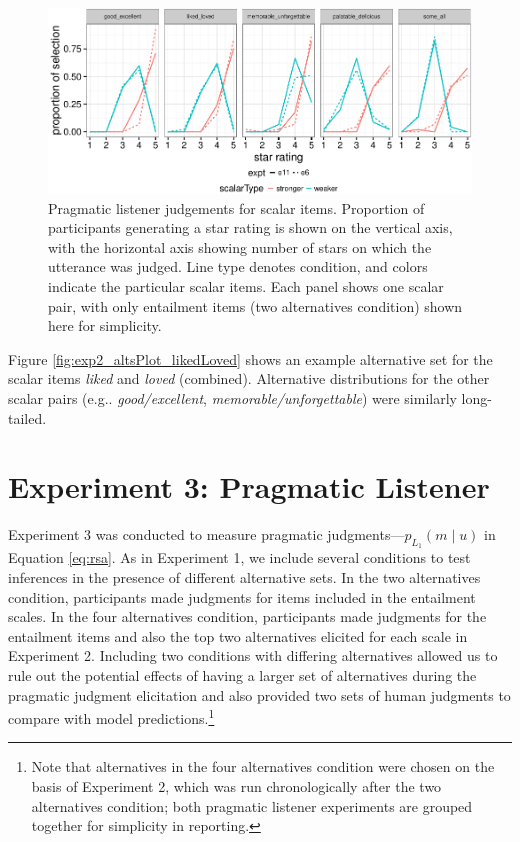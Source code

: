 \documentclass[10pt, letterpaper]{article}
\newenvironment{CodeChunk}{}{}
\begin{document}
\begin{CodeChunk}
\begin{figure}[t]

{\centering \includegraphics{figs/exp2Plots-1} 

}

\caption[Pragmatic listener judgements for scalar items]{Pragmatic listener judgements for scalar items. Proportion of participants generating a star rating is shown on the vertical axis, with the horizontal axis showing number of stars on which the utterance was judged. Line type denotes condition, and colors indicate the particular scalar items. Each panel shows one scalar pair, with only entailment items (two alternatives condition) shown here for simplicity.}\label{fig:exp2Plots}
\end{figure}
\end{CodeChunk}

Figure \ref{fig:exp2_altsPlot_likedLoved} shows an example alternative
set for the scalar items \emph{liked} and \emph{loved} (combined).
Alternative distributions for the other scalar pairs (e.g..
\emph{good/excellent}, \emph{memorable/unforgettable}) were similarly
long-tailed.

\section{Experiment 3: Pragmatic
Listener}\label{experiment-3-pragmatic-listener}

Experiment 3 was conducted to measure pragmatic
judgments---\(p_{L_1}(m \mid u)\) in Equation \ref{eq:rsa}. As in
Experiment 1, we include several conditions to test inferences in the
presence of different alternative sets. In the two alternatives
condition, participants made judgments for items included in the
entailment scales. In the four alternatives condition, participants made
judgments for the entailment items and also the top two alternatives
elicited for each scale in Experiment 2. Including two conditions with
differing alternatives allowed us to rule out the potential effects of
having a larger set of alternatives during the pragmatic judgment
elicitation and also provided two sets of human judgments to compare
with model
predictions.\footnote{Note that alternatives in the four alternatives condition were chosen on the basis of Experiment 2, which was run chronologically after the two alternatives condition; both pragmatic listener experiments are grouped together for simplicity in reporting.}
\end{document}
